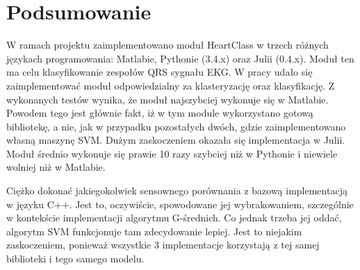 \section{Podsumowanie}

\qquad W ramach projektu zaimplementowano moduł HeartClass w trzech różnych językach programowania: Matlabie, Pythonie (3.4.x) oraz Julii (0.4.x). Moduł ten ma celu klasyfikowanie zespołów QRS sygnału EKG. W pracy udało się zaimplementować moduł odpowiedzialny za klasteryzację oraz klasyfikację. Z wykonanych testów wynika, że moduł najszybciej wykonuje się w Matlabie. Powodem tego jest głównie fakt, iż w tym module wykorzystano gotową bibliotekę, a nie, jak w przypadku pozostałych dwóch, gdzie zaimplementowano własną maszynę SVM. Dużym zaskoczeniem okazała się implementacja w Julii. Moduł średnio wykonuje się prawie 10 razy szybciej niż w Pythonie i niewiele wolniej niż w Matlabie.

Ciężko dokonać jakiegokolwiek sensownego porównania z bazową implementacją w języku C++. Jest to, oczywiście, spowodowane jej wybrakowaniem, szczególnie w kontekście implementacji algorytmu G-średnich. Co jednak trzeba jej oddać, algorytm SVM funkcjonuje tam zdecydowanie lepiej. Jest to niejakim zaskoczeniem, ponieważ wszystkie 3 implementacje korzystają z tej samej biblioteki i tego samego modelu.

